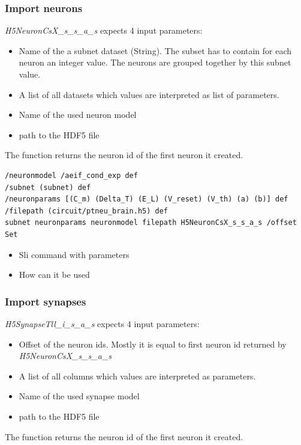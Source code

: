 \documentclass[a4paper]{article}
\begin{document}
\subsubsection{Import neurons}
\emph{H5NeuronCsX\_s\_s\_a\_s} expects 4 input parameters:
\begin{itemize}
      \item Name of the a subnet dataset (String).
The subset has to contain for each neuron an integer value.
The neurons are grouped together by this subnet value.

      \item A list of all datasets which values are interpreted as list of parameters.
      
      \item Name of the used neuron model
      
      \item path to the HDF5 file 
\end{itemize}
The function returns the neuron id of the first neuron it created.

\begin{lstlisting}[label=sliNeurons,caption=Calling the neuron import module via H5NeuronCsX\_s\_s\_a\_s SLI command ]
/neuronmodel /aeif_cond_exp def
/subnet (subnet) def
/neuronparams [(C_m) (Delta_T) (E_L) (V_reset) (V_th) (a) (b)] def
/filepath (circuit/ptneu_brain.h5) def
subnet neuronparams neuronmodel filepath H5NeuronCsX_s_s_a_s /offset Set
\end{lstlisting}



\begin{itemize}
      \item Sli command with parameters
      \item How can it be used
\end{itemize}

\subsubsection{Import synapses}
\emph{H5SynapseTll\_i\_s\_a\_s} expects 4 input parameters:
\begin{itemize}
      \item Offset of the neuron ids. Mostly it is equal to first neuron id returned by \emph{H5NeuronCsX\_s\_s\_a\_s}

      \item A list of all columns which values are interpreted as parameters.
      
      \item Name of the used synapse model
      
      \item path to the HDF5 file 
\end{itemize}
The function returns the neuron id of the first neuron it created.
\end{document}
